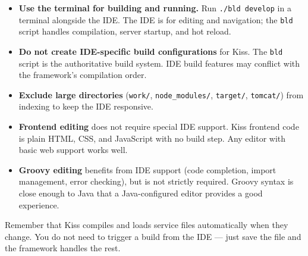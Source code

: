 \begin{itemize}
  \item \textbf{Use the terminal for building and running.}  Run \texttt{./bld develop} in a terminal alongside the IDE.  The IDE is for editing and navigation; the \texttt{bld} script handles compilation, server startup, and hot reload.

  \item \textbf{Do not create IDE-specific build configurations} for Kiss.  The \texttt{bld} script is the authoritative build system.  IDE build features may conflict with the framework's compilation order.

  \item \textbf{Exclude large directories} (\texttt{work/}, \texttt{node\_modules/}, \texttt{target/}, \texttt{tomcat/}) from indexing to keep the IDE responsive.

  \item \textbf{Frontend editing} does not require special IDE support.  Kiss frontend code is plain HTML, CSS, and JavaScript with no build step.  Any editor with basic web support works well.

  \item \textbf{Groovy editing} benefits from IDE support (code completion, import management, error checking), but is not strictly required.  Groovy syntax is close enough to Java that a Java-configured editor provides a good experience.
\end{itemize}

\begin{notebox}
Remember that Kiss compiles and loads service files automatically when they change.  You do not need to trigger a build from the IDE --- just save the file and the framework handles the rest.
\end{notebox}
